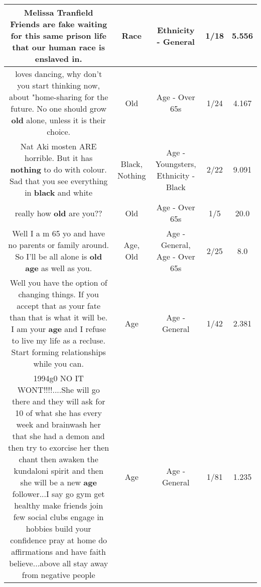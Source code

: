 \documentclass[11pt]{article}
\newlength\mylength
\begin{document}
\begin{center}
\begin{longtable}{|C{.65\mylength}|C{.30\mylength}|C{.12\mylength}|C{.12\mylength}|C{.12\mylength}|}
  \small Melissa Tranfield Friends are fake waiting for this same prison life that our human \textbf{race} is enslaved in.\normalsize   & Race & Ethnicity - General & 1/18 & 5.556 \\  \hline
  \small loves dancing, why don't you start thinking now, about "home-sharing for the future. No one should grow \textbf{old} alone, unless it is their choice.\normalsize   & Old & Age - Over 65s & 1/24 & 4.167 \\  \hline
  \small Nat Aki mosten ARE horrible. But it has \textbf{nothing} to do with colour. Sad that you see everything in \textbf{black} and white\normalsize   & Black, Nothing & Age - Youngsters, Ethnicity - Black & 2/22 & 9.091 \\  \hline
  \small really how \textbf{old} are you??\normalsize   & Old & Age - Over 65s & 1/5 & 20.0 \\  \hline
  \small Well I a m 65 yo and have no parents or family around. So I'll be all alone is \textbf{old} \textbf{age} as well as you.\normalsize   & Age, Old & Age - General, Age - Over 65s & 2/25 & 8.0 \\  \hline
  \small Well you have the option of changing things. If you accept that as your fate than that is what it will be. I am your \textbf{age} and I refuse to live my life as a recluse. Start forming relationships while you can.\normalsize   & Age & Age - General & 1/42 & 2.381 \\  \hline
  \small \@1994g0 NO IT WONT!!!!....She will go there and they will ask for 10 of what she has every week and brainwash her that she had a demon and then try to exorcise her  then chant then awaken the kundaloni spirit and then she will be a new \textbf{age} follower...I say go gym get healthy make friends join few social clubs engage in hobbies build your confidence pray at home do affirmations and have faith believe...above all stay away from negative people\normalsize   & Age & Age - General & 1/81 & 1.235 \\  \hline

\end{longtable}
\end{center}
\end{document}
